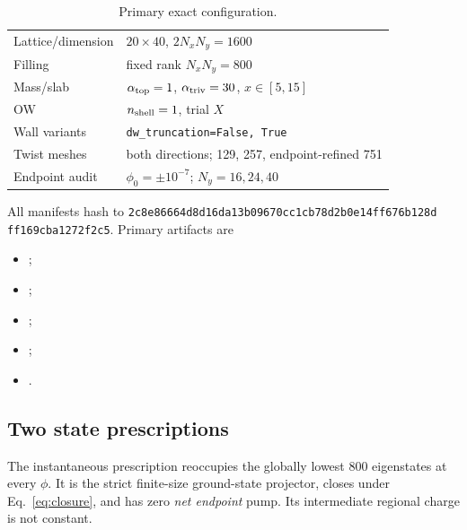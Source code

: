 \documentclass[aps,prb,onecolumn,nofootinbib,superscriptaddress]{revtex4-2}
\newcommand{\code}[1]{\texttt{#1}}
\begin{document}
\begin{table}[b]
\caption{Primary exact configuration.}
\begin{ruledtabular}
\begin{tabular}{ll}
Lattice/dimension & $20\times40$, $2N_xN_y=1600$ \\
Filling & fixed rank $N_xN_y=800$ \\
Mass/slab & $\alpha_{\rm top}=1$, $\alpha_{\rm triv}=30$, $x\in[5,15]$ \\
OW & $n_{\rm shell}=1$, trial $X$ \\
Wall variants & \code{dw\_truncation=False, True} \\
Twist meshes & both directions; 129, 257, endpoint-refined 751 \\
Endpoint audit & $\phi_0=\pm10^{-7}$; $N_y=16,24,40$ \\
\end{tabular}
\end{ruledtabular}
\end{table}

\begingroup
\sloppy
All manifests hash  to
\code{2c8e86664d8d16da\allowbreak13b09670cc1cb78d\allowbreak2b0e14ff676b128d\allowbreak
ff169cba1272f2c5}.
Primary artifacts are
\begin{itemize}
 \item {};
 \item {};
 \item {};
 \item {};
 \item {}.
\end{itemize}
\endgroup

\subsection{Two state prescriptions}

The instantaneous prescription reoccupies the globally lowest 800 eigenstates
at every $\phi$.  It is the strict finite-size ground-state projector, closes
under Eq.~\eqref{eq:closure}, and has zero \emph{net endpoint} pump.  Its
intermediate regional charge is not constant.
\end{document}
